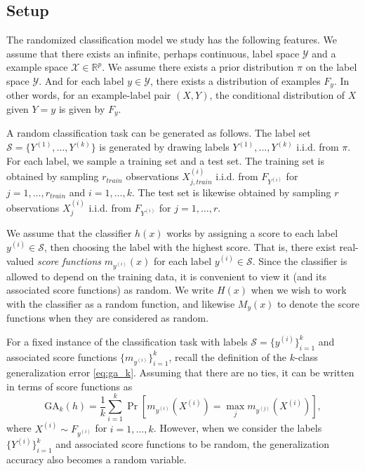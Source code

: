 \documentclass[twoside,11pt]{article}
\begin{document}
\subsection{Setup}

The randomized classification model we study has the following
features.  We assume that there exists an infinite, perhaps continuous, label space $\mathcal{Y}$ and a example space $\mathcal{X} \in \mathbb{R}^p$.  
We assume there exists a prior distribution $\pi$ on the label space $\mathcal{Y}$.
And for each label $y \in \mathcal{Y}$,
there exists a distribution of examples $F_y$. In other words, for an example-label pair $(X, Y)$, the conditional distribution
of $X$ given $Y = y$ is given by $F_y$.  

A random classification task can be generated as follows.  The
label set $\mathcal{S} = \{Y^{(1)},\hdots, Y^{(k)}\}$ is generated by
drawing labels $Y^{(1)},\hdots, Y^{(k)}$ i.i.d. from $\pi$.  
For each label, we sample a training set and a
test set.  The training set is obtained by sampling $r_{train}$ observations
$X_{j, train}^{(i)}$ i.i.d. from $F_{Y^{(i)}}$ for $j = 1,\hdots,
r_{train}$ and $i = 1,\hdots, k$.  The test set is likewise obtained by sampling $r$
observations $X_j^{(i)}$ i.i.d. from $F_{Y^{(i)}}$ for $j = 1,\hdots,
r$.  

We assume that the classifier $h(x)$ works by assigning a score to each label $y^{(i)} \in \mathcal{S}$, then choosing the label with the highest score.  That is, there exist real-valued \emph{score functions} $m_{y^{(i)}}(x)$ for each label $y^{(i)} \in \mathcal{S}$.
Since the classifier is allowed to depend on the training data, it is convenient to view it (and its associated score functions) as random.  We write $H(x)$ when we wish to work with the classifier as a random function, and likewise $M_y(x)$ to denote the score functions when they are considered as random.

For a fixed instance of the classification task with labels $\mathcal{S} = \{y^{(i)}\}_{i=1}^k$ and associated score functions $\{m_{y^{(i)}}\}_{i=1}^k$, recall the definition of the $k$-class generalization error \eqref{eq:ga_k}.  Assuming that there are no ties, it can be written in terms of score functions as
\[
\text{GA}_k(h) = \frac{1}{k} \sum_{i=1}^k  \Pr[m_{y^{(i)}}(X^{(i)}) = \max_j
m_{y^{(j)}}(X^{(i)})],
\]
where $X^{(i)} \sim F_{y^{(i)}}$ for $i =1,\hdots, k$.
However, when we consider the labels $\{Y^{(i)}\}_{i=1}^k$ and associated score functions to be random, the generalization accuracy also becomes a random variable.
\end{document}
